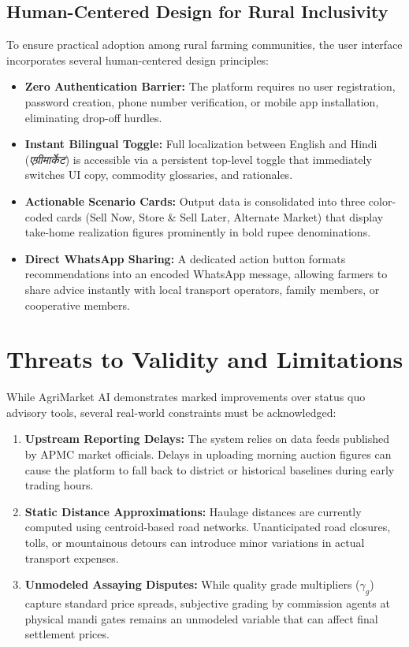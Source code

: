 \documentclass[conference]{IEEEtran}
\begin{document}
\subsection{Human-Centered Design for Rural Inclusivity}
To ensure practical adoption among rural farming communities, the user interface incorporates several human-centered design principles:
\begin{itemize}
    \item \textbf{Zero Authentication Barrier:} The platform requires no user registration, password creation, phone number verification, or mobile app installation, eliminating drop-off hurdles.
    \item \textbf{Instant Bilingual Toggle:} Full localization between English and Hindi (\textit{एग्रीमार्केट}) is accessible via a persistent top-level toggle that immediately switches UI copy, commodity glossaries, and rationales.
    \item \textbf{Actionable Scenario Cards:} Output data is consolidated into three color-coded cards (Sell Now, Store & Sell Later, Alternate Market) that display take-home realization figures prominently in bold rupee denominations.
    \item \textbf{Direct WhatsApp Sharing:} A dedicated action button formats recommendations into an encoded WhatsApp message, allowing farmers to share advice instantly with local transport operators, family members, or cooperative members.
\end{itemize}

\section{Threats to Validity and Limitations}

While AgriMarket AI demonstrates marked improvements over status quo advisory tools, several real-world constraints must be acknowledged:
\begin{enumerate}
    \item \textbf{Upstream Reporting Delays:} The system relies on data feeds published by APMC market officials. Delays in uploading morning auction figures can cause the platform to fall back to district or historical baselines during early trading hours.
    \item \textbf{Static Distance Approximations:} Haulage distances are currently computed using centroid-based road networks. Unanticipated road closures, tolls, or mountainous detours can introduce minor variations in actual transport expenses.
    \item \textbf{Unmodeled Assaying Disputes:} While quality grade multipliers ($\gamma_g$) capture standard price spreads, subjective grading by commission agents at physical mandi gates remains an unmodeled variable that can affect final settlement prices.
\end{enumerate}
\end{document}

